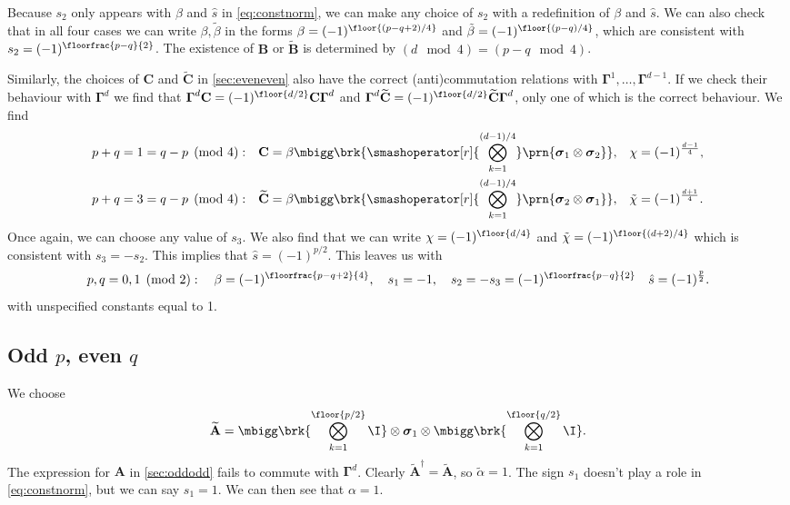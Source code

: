 \documentclass[11pt]{article}
\newcommand{\Gammab}{\boldsymbol{\Gamma}}
\newcommand{\A}{\mathbf{A}}
\newcommand{\B}{\mathbf{B}}
\renewcommand{\C}{\mathbf{C}}
\newcommand{\At}{\widetilde{\A}}
\newcommand{\Bt}{\widetilde{\B}}
\newcommand{\Ct}{\widetilde{\C}}
\newcommand{\sigmab}{\boldsymbol{\sigma}}
\newcommand{\alphat}{\tilde{\alpha}}
\newcommand{\betat}{\tilde{\beta}}
\newcommand{\chit}{\tilde{\chi}}
\begin{document}
Because $s_2$ only appears with $\beta$ and $\hat{s}$ in \cref{eq:constnorm}, we can make any choice of $s_2$ with a redefinition of $\beta$ and $\hat{s}$.
We can also check that in all four cases we can write $\beta, \betat$ in the forms $\beta = (-1)^{\floor{(p-q+2)/4}}$ and $\betat = (-1)^{\floor{(p-q)/4}}$, 
which are consistent with \(s_2 = (-1)^{\floorfrac{p-q}{2}}\).
The existence of $\B$ or $\Bt$ is determined by $(d \mod 4) = (p-q \mod 4)$.

Similarly, the choices of $\C$ and $\Ct$ in \cref{sec:eveneven} also have the correct (anti)commutation relations with $\Gammab^1, \ldots, \Gammab^{d-1}$.
If we check their behaviour with $\Gammab^d$ we find that $\Gammab^d \C = (-1)^{\floor{d/2}}\C \Gammab^d$ and $\Gammab^d \Ct = (-1)^{\floor{d/2}} \Ct \Gammab^d$, only one of which is the correct behaviour.
We find
%
\begin{equation*}
\begin{aligned}
  p+q &= 1 = q-p \pmod 4: &
  \C &= \beta \mbigg\brk{\smashoperator[r]{\bigotimes_{k=1}^{(d-1)/4}}
        \prn{\sigmab_1 \otimes \sigmab_2}}, &
  \chi &= (-1)^{\frac{d-1}{4}},
  \\
  p+q &= 3 = q-p \pmod 4: &
  \Ct &= \beta \mbigg\brk{\smashoperator[r]{\bigotimes_{k=1}^{(d-1)/4}}
        \prn{\sigmab_2 \otimes \sigmab_1}}, &
  \chit &= (-1)^{\frac{d+1}{4}}.
\end{aligned}
\end{equation*}
%
Once again, we can choose any value of $s_3$.
We also find that we can write $\chi = (-1)^{\floor{d/4}}$ and $\chit = (-1)^{\floor{(d+2)/4}}$ which is consistent with \(s_3 = -s_2\).
This implies that $\hat{s} = (-1)^{p/2}$.
This leaves us with
%
\begin{equation}\label{eq:constevenodd}
  p, q = 0,1 \pmod 2 : \quad
  \beta = (-1)^{\floorfrac{p-q+2}{4}}, \quad
  s_1 = -1, \quad
  s_2 = -s_3 = (-1)^{\floorfrac{p-q}{2}} \quad
  \hat{s} = (-1)^{\frac{p}{2}}.
\end{equation}
%
with unspecified constants equal to 1.



\subsection{Odd \texorpdfstring{$p$}{p}, even \texorpdfstring{$q$}{q}}\label{sec:oddeven}

We choose
%
\begin{equation*}
  \At =
        \mbigg\brk{\bigotimes_{k=1}^{\floor{p/2}} \I}
        \otimes \sigmab_1
        \otimes \mbigg\brk{\bigotimes_{k=1}^{\floor{q/2}} \I}.
\end{equation*}
%
The expression for $\A$ in \cref{sec:oddodd} fails to commute with $\Gammab^d$.
Clearly \(\At^\dag = \At\), so \(\alphat = 1\).
The sign $s_1$ doesn't play a role in \cref{eq:constnorm}, but we can say $s_1 = 1$.
We can then see that $\alpha = 1$.
\end{document}
